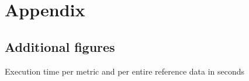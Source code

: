 \documentclass{thesisclass}
\begin{document}


\cleardoublepage

\appendix

\chapter{Appendix}
\label{ch:appendix}

\section{Additional figures}

\begin{centeredFigure}[!ht]
	\caption{Execution time per metric and per entire reference data in seconds}
	\label{fig:times}
\end{centeredFigure}

\newpage
\end{document}
